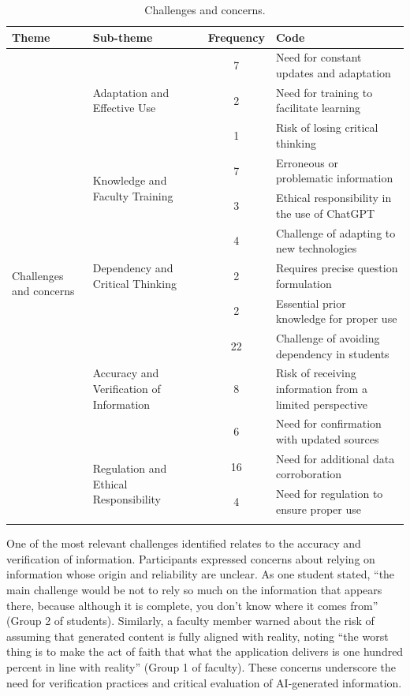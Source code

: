 \documentclass[english]{textolivre}
\begin{document}
\begin{table}[h!]
\centering
\begin{threeparttable}
\caption{Challenges and concerns.}
\label{tab5}
\begin{tabular}{p{2.5cm} p{3cm} c p{6cm}}
\toprule
Theme & Sub-theme & Frequency & Code \\
\midrule
\multirow{13}{=}{Challenges and concerns}

& \multirow{3}{=}{Adaptation and Effective Use}
& 7 & Need for constant updates and adaptation \\
& & 2 & Need for training to facilitate learning \\
& & 1 & Risk of losing critical thinking \\

& \multirow{2}{=}{Knowledge and Faculty Training}
& 7 & Erroneous or problematic information \\
& & 3 & Ethical responsibility in the use of ChatGPT \\

& \multirow{3}{=}{Dependency and Critical Thinking}
& 4 & Challenge of adapting to new technologies \\
& & 2 & Requires precise question formulation \\
& & 2 & Essential prior knowledge for proper use \\

& \multirow{3}{=}{Accuracy and Verification of Information}
& 22 & Challenge of avoiding dependency in students \\
& & 8 & Risk of receiving information from a limited perspective \\
& & 6 & Need for confirmation with updated sources \\

& \multirow{2}{=}{Regulation and Ethical Responsibility}
& 16 & Need for additional data corroboration \\
& & 4 & Need for regulation to ensure proper use \\
\\
\bottomrule
\end{tabular}
\end{threeparttable}
\end{table}

One of the most relevant challenges identified relates to the accuracy and verification of information. Participants expressed concerns about relying on information whose origin and reliability are unclear. As one student stated, “the main challenge would be not to rely so much on the information that appears there, because although it is complete, you don’t know where it comes from” (Group 2 of students). Similarly, a faculty member warned about the risk of assuming that generated content is fully aligned with reality, noting “the worst thing is to make the act of faith that what the application delivers is one hundred percent in line with reality” (Group 1 of faculty). These concerns underscore the need for verification practices and critical evaluation of AI-generated information.
\end{document}
